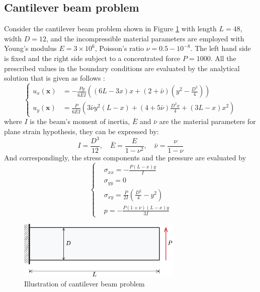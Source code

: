 \subsection{Cantilever beam problem}\label{sec:cantilever}
Consider the cantilever beam problem shown in Figure \ref{fg:cantilever_model} with length $L = 48$, width $D = 12$, and the incompressible material parameters are employed with Young's modulus $E = 3\times 10^6$, Poisson's ratio $\nu = 0.5-10^{-8}$. The left hand side is fixed and the right side subject to a concentrated force $P = 1000$. All the prescribed values in the boundary conditions are evaluated by the analytical solution that is given as follows \cite{timoshenko1969}:
\begin{equation}
\left\{
\begin{aligned}
u_x(\boldsymbol{x}) &= - \frac{Py}{6\bar{E}I} \left( (6L - 3x)x + (2 + \bar{\nu})(y^2 - \frac{D^2}{4}) \right) \\
u_y(\boldsymbol{x}) &= \frac{P}{6\bar{E}I} \left( 3 \bar{\nu} y^2(L-x) + (4+5\bar{\nu}) \frac{D^2x}{4} + (3L-x)x^2 \right)
\end{aligned}
\right.
\end{equation}
where $I$ is the beam's moment of inertia, $\bar{E}$ and $\bar{\nu}$ are the material parameters for plane strain hypothesis, they can be expressed by:
\begin{equation}
I = \frac{D^3}{12}, \quad \bar{E} = \frac{E}{1-\nu^2}, \quad \bar{\nu} = \frac{\nu}{1-\nu}
\end{equation}
And correspondingly, the stress components and the pressure are evaluated by
\begin{equation}\label{cantilever_stress}
\left\{
\begin{aligned}
&\sigma_{xx} = - \frac{P(L-x)y}{I} \\
&\sigma_{yy} = 0 \\
&\sigma_{xy} = \frac{P}{2I}(\frac{D^2}{4}-y^2) \\
&p = - \frac{P(1+\nu)(L-x)y}{3I}
\end{aligned}
\right.
\end{equation}

\begin{figure}[H]
\centering
\includegraphics[width=0.7\textwidth]{cantilever_model.png}
\caption{Illustration of cantilever beam problem}\label{fg:cantilever_model}
\end{figure}

